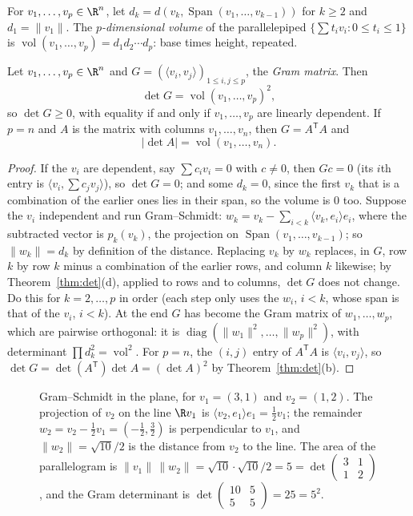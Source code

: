 \begin{definitionx}
For $v_1,\dots,v_p\in\R^n$, let $d_k=d\left(v_k,\operatorname{Span}(v_1,\dots,v_{k-1})\right)$ for $k\ge2$ and $d_1=\|v_1\|$. The \emph{$p$-dimensional volume} of the parallelepiped $\{\sum t_iv_i:0\le t_i\le1\}$ is $\operatorname{vol}(v_1,\dots,v_p)=d_1d_2\cdots d_p$: base times height, repeated.
\end{definitionx}

\begin{theorem}\label{thm:gram}
Let $v_1,\dots,v_p\in\R^n$ and $G=\left(\langle v_i,v_j\rangle\right)_{1\le i,j\le p}$, the \emph{Gram matrix}. Then
\[
\det G=\operatorname{vol}(v_1,\dots,v_p)^2 ,
\]
so $\det G\ge0$, with equality if and only if $v_1,\dots,v_p$ are linearly dependent. If $p=n$ and $A$ is the matrix with columns $v_1,\dots,v_n$, then $G=A^{\mathsf T}A$ and
\[
|\det A|=\operatorname{vol}(v_1,\dots,v_n).
\]
\end{theorem}
\begin{proof}
If the $v_i$ are dependent, say $\sum c_iv_i=0$ with $c\ne0$, then $Gc=0$ (its $i$th entry is $\langle v_i,\sum c_jv_j\rangle$), so $\det G=0$; and some $d_k=0$, since the first $v_k$ that is a combination of the earlier ones lies in their span, so the volume is $0$ too. Suppose the $v_i$ independent and run Gram--Schmidt: $w_k=v_k-\sum_{i<k}\langle v_k,e_i\rangle e_i$, where the subtracted vector is $p_k(v_k)$, the projection on $\operatorname{Span}(v_1,\dots,v_{k-1})$; so $\|w_k\|=d_k$ by definition of the distance. Replacing $v_k$ by $w_k$ replaces, in $G$, row $k$ by row $k$ minus a combination of the earlier rows, and column $k$ likewise; by Theorem~\ref{thm:det}(d), applied to rows and to columns, $\det G$ does not change. Do this for $k=2,\dots,p$ in order (each step only uses the $w_i$, $i<k$, whose span is that of the $v_i$, $i<k$). At the end $G$ has become the Gram matrix of $w_1,\dots,w_p$, which are pairwise orthogonal: it is $\operatorname{diag}(\|w_1\|^2,\dots,\|w_p\|^2)$, with determinant $\prod d_k^2=\operatorname{vol}^2$. For $p=n$, the $(i,j)$ entry of $A^{\mathsf T}A$ is $\langle v_i,v_j\rangle$, so $\det G=\det(A^{\mathsf T})\det A=(\det A)^2$ by Theorem~\ref{thm:det}(b).
\end{proof}

\begin{figure}[ht]
\centering
{}
\caption{Gram--Schmidt in the plane, for $v_1=(3,1)$ and $v_2=(1,2)$. The projection of $v_2$ on the line $\R v_1$ is $\langle v_2,e_1\rangle e_1=\frac12v_1$; the remainder $w_2=v_2-\frac12v_1=(-\frac12,\frac32)$ is perpendicular to $v_1$, and $\|w_2\|=\sqrt{10}/2$ is the distance from $v_2$ to the line. The area of the parallelogram is $\|v_1\|\,\|w_2\|=\sqrt{10}\cdot\sqrt{10}/2=5=\det\begin{pmatrix}3&1\\1&2\end{pmatrix}$, and the Gram determinant is $\det\begin{pmatrix}10&5\\5&5\end{pmatrix}=25=5^2$.}
\label{fig:gramschmidt}
\end{figure}

